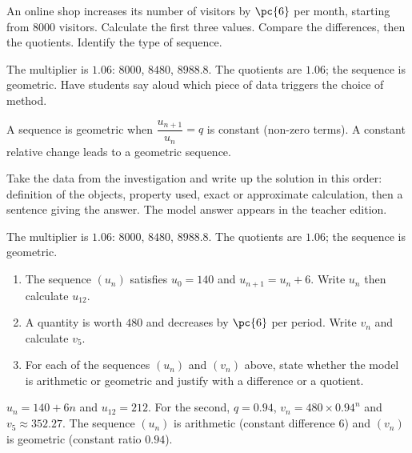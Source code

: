     \begin{activity}
    An online shop increases its number of visitors by $\pc{6}$ per month, starting from $\num{8000}$ visitors. Calculate the first three values. Compare the differences, then the quotients. Identify the type of sequence.
    \begin{center}\end{center}
    \end{activity}
    \begin{solution}The multiplier is $\num{1,06}$: $\num{8000}$, $\num{8480}$, $\num{8988,8}$. The quotients are $\num{1,06}$; the sequence is geometric. Have students say aloud which piece of data triggers the choice of method.\end{solution}

    \begin{summary}A sequence is geometric when $\dfrac{u_{n+1}}{u_n}=q$ is constant (non-zero terms). A constant relative change leads to a geometric sequence.\end{summary}

    \begin{example}
    Take the data from the investigation and write up the solution in this order: definition of the objects, property used, exact or approximate calculation, then a sentence giving the answer. The model answer appears in the teacher edition.
    \end{example}
    \begin{solution}The multiplier is $\num{1,06}$: $\num{8000}$, $\num{8480}$, $\num{8988,8}$. The quotients are $\num{1,06}$; the sequence is geometric.\end{solution}

    \begin{exercise}[essential]
    \begin{enumerate}\item The sequence $(u_n)$ satisfies $u_0=140$ and $u_{n+1}=u_n+6$. Write $u_n$ then calculate $u_{12}$.\item A quantity is worth $480$ and decreases by $\pc{6}$ per period. Write $v_n$ and calculate $v_5$.\item For each of the sequences $(u_n)$ and $(v_n)$ above, state whether the model is arithmetic or geometric and justify with a difference or a quotient.\end{enumerate}
    \end{exercise}
    \begin{solution}$u_n=140+6n$ and $u_{12}=212$. For the second, $q=\num{0,94}$, $v_n=480\times\num{0,94}^n$ and $v_5\approx\num{352,27}$. The sequence $(u_n)$ is arithmetic (constant difference $6$) and $(v_n)$ is geometric (constant ratio $\num{0,94}$).\end{solution}

